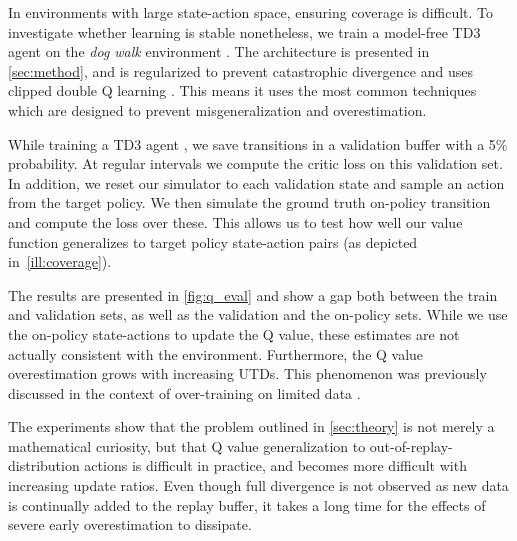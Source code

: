 In environments with large state-action space, ensuring coverage is difficult.
To investigate whether learning is stable nonetheless, we train a model-free TD3 agent on the \emph{dog walk} environment \parencite{tunyasuvunakool2020}.
The architecture is presented in \autoref{sec:method}, and is regularized to prevent catastrophic divergence \parencite{hussing2024dissecting,nauman2024overestimation} and uses clipped double Q learning \parencite{fujimoto2018addressing}.
This means it uses the most common techniques which are designed to prevent misgeneralization and overestimation.

While training a TD3 agent \parencite{fujimoto2018addressing}, we save transitions in a validation buffer with a 5\% probability.
At regular intervals we compute the critic loss on this validation set.
In addition, we reset our simulator to each validation state and sample an action from the target policy.
We then simulate the ground truth on-policy transition and compute the loss over these.
This allows us to test how well our value function generalizes to target policy state-action pairs (as depicted in~\autoref{ill:coverage}).

The results are presented in \autoref{fig:q_eval} and show a gap both between the train and validation sets, as well as the validation and the on-policy sets.
While we use the on-policy state-actions to update the Q value, these estimates are not actually consistent with the environment.
Furthermore, the Q value overestimation grows with increasing UTDs.
This phenomenon was previously discussed in the context of over-training on limited data \parencite{hussing2024dissecting} .

The experiments show that the problem outlined in \autoref{sec:theory} is not merely a mathematical curiosity, but that Q value generalization to out-of-replay-distribution actions is difficult in practice, and becomes more difficult with increasing update ratios.
Even though full divergence is not observed as new data is continually added to the replay buffer, it takes a long time for the effects of severe early overestimation to dissipate.

